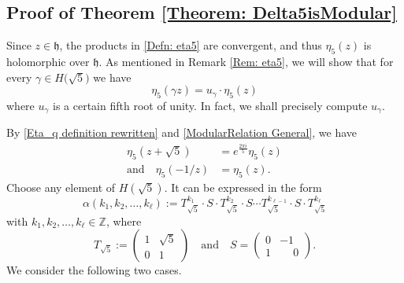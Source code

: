 \documentclass[11pt]{amsart}
\numberwithin{equation}{section}
\theoremstyle{remark}
\begin{document}
\subsection{Proof of Theorem \ref{Theorem: Delta5isModular}} Since $z \in \mathfrak{h}$, the products in \eqref{Defn: eta5} are convergent, and thus $\eta_5(z)$ is holomorphic over $\mathfrak{h}$. As mentioned in Remark \ref{Rem: eta5}, we will show that for every
$\gamma \in H\big(\sqrt{5}\big)$ we have $$\eta_5\left(\gamma z \right) = u_\gamma\cdot \eta_5(z)$$ where $u_\gamma$ is a certain fifth root of unity. In fact, we shall precisely compute $u_{\gamma}$.

\par
By \eqref{Eta_q definition rewritten} and \eqref{ModularRelation General}, we have
\begin{align}
    \eta_5(z+\sqrt{5}) &= e^{\frac{2\pi i}{5}} \eta_5(z) \label{Eq: Relation 1, q=5}\\
    \textrm{and} \quad \eta_5(-1/z) &= \eta_5(z). \label{Eq: Relation 2, q=5}
\end{align}
Choose any element of $H(\sqrt{5})$. It can be expressed in the form
\begin{equation*} 
\alpha(k_1,k_2, \ldots,k_\ell) := T_{\sqrt{5}}^{k_1} \cdot S \cdot T_{\sqrt{5}}^{k_2} \cdot  S  \cdots  T_{\sqrt{5}}^{k_{\ell-1}}\cdot S \cdot T_{\sqrt{5}}^{k_\ell}
\end{equation*}
with $k_1, k_2, \ldots,k_\ell\in\mathbb Z$, where
$$T_{\sqrt{5}}:= \begin{pmatrix} 1&\sqrt{5} \\0&1\end{pmatrix}\quad \textrm{and} \quad S = \begin{pmatrix} 0&-1\\1&\phantom{-}0\end{pmatrix}.$$
We consider the following two cases.\\
\end{document}
